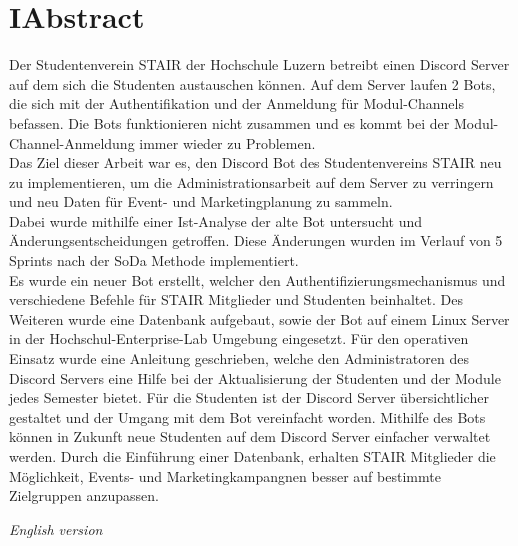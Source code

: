\documentclass[a4paper, table]{article}
\begin{document}
\section*{I{\hspace*{1cm}}Abstract}
Der Studentenverein STAIR der Hochschule Luzern betreibt einen Discord Server auf dem sich die Studenten austauschen können.
Auf dem Server laufen 2 Bots, die sich mit der Authentifikation und der Anmeldung für Modul-Channels befassen.
Die Bots funktionieren nicht zusammen und es kommt bei der Modul-Channel-Anmeldung immer wieder zu Problemen.\\
Das Ziel dieser Arbeit war es, den Discord Bot des Studentenvereins STAIR neu zu implementieren, 
um die Administrationsarbeit auf dem Server zu verringern und neu Daten für Event- und Marketingplanung zu sammeln.\\
Dabei wurde mithilfe einer Ist-Analyse der alte Bot untersucht und Änderungsentscheidungen getroffen.
Diese Änderungen wurden im Verlauf von 5 Sprints nach der \gls{SoDa} Methode implementiert.\\
Es wurde ein neuer Bot erstellt, welcher den Authentifizierungsmechanismus und verschiedene Befehle für STAIR Mitglieder und Studenten beinhaltet.
Des Weiteren wurde eine Datenbank aufgebaut, sowie der Bot auf einem Linux Server in der Hochschul-Enterprise-Lab Umgebung eingesetzt.
Für den operativen Einsatz wurde eine Anleitung geschrieben, welche den Administratoren des Discord Servers eine Hilfe bei der Aktualisierung der Studenten und der Module jedes Semester bietet.
Für die Studenten ist der Discord Server übersichtlicher gestaltet und der Umgang mit dem Bot vereinfacht worden.
Mithilfe des Bots können in Zukunft neue Studenten auf dem Discord Server einfacher verwaltet werden.
Durch die Einführung einer Datenbank, erhalten STAIR Mitglieder die Möglichkeit, Events- und Marketingkampangnen besser auf bestimmte Zielgruppen anzupassen.

\textit{English version}


\newpage

\printnoidxglossaries


\newpage
\tableofcontents

\newpage
\end{document}
